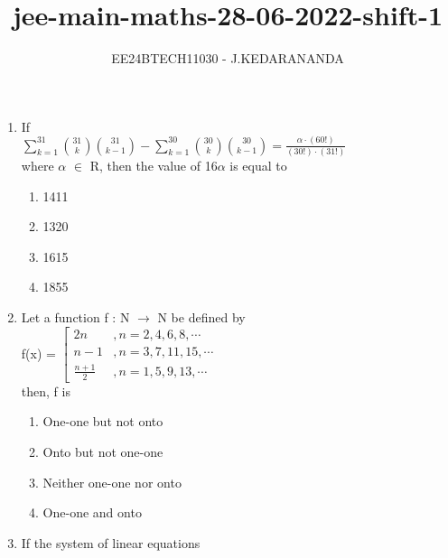 \documentclass[journal]{IEEEtran}
\renewcommand{\thefigure}{\theenumi}
\renewcommand{\thetable}{\theenumi}
\numberwithin{equation}{enumi}
\numberwithin{figure}{enumi}
\renewcommand{\thetable}{\theenumi}
\begin{document}

\vspace{3cm}

\title{jee-main-maths-28-06-2022-shift-1}
\author{EE24BTECH11030 - J.KEDARANANDA}
{\let\newpage\relax\maketitle}
\renewcommand{\thefigure}{\theenumi}
\renewcommand{\thetable}{\theenumi}
\begin{enumerate}
    \item  If\\
    $ \sum_{k=1}^{31} \binom{31}{k} \binom{31}{k-1} - \sum_{k=1}^{30} \binom{30}{k} \binom{30}{k-1} = \frac{\alpha \cdot (60!)}{(30!) \cdot (31!)} $\\ where $\alpha$ $\in$ R, then the value of 16$\alpha$ is equal to 
    \begin{multicols}{4}
    \begin{enumerate}
        \item 1411
        \item 1320
        \item 1615
        \item 1855
    \end{enumerate}
    \end{multicols}
    \bigskip
    \item Let a function f : N $\rightarrow$ N be defined by\\
    f(x) = $\left[\begin{array}{ll}2n& , n = 2,4,6,8,\cdots\\ n - 1 & , n = 3,7,11,15,\cdots\\\frac{n + 1}{2}  &, n = 1,5,9,13,\cdots \end{array}\right.$\\
    then, f is 
    \begin{enumerate}
        \item One-one but not onto
        \item Onto but not one-one
        \item Neither one-one nor onto
        \item One-one and onto
    \end{enumerate} 
    \bigskip
    \item If the system of linear equations\\

\end{enumerate}
\end{document}
